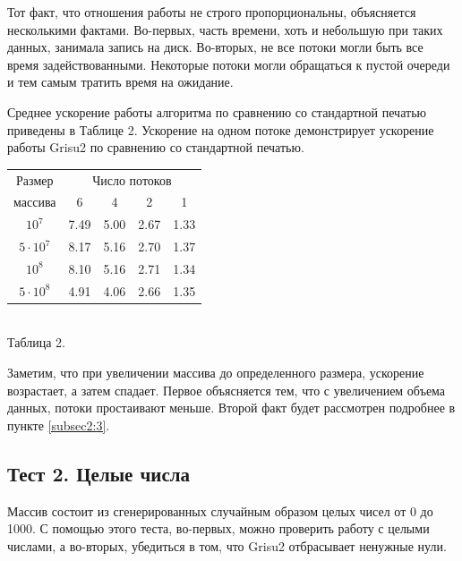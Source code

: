 Тот факт, что отношения работы не строго пропорциональны, объясняется несколькими фактами.
Во-первых, часть времени, хоть и небольшую при таких данных, занимала запись на диск.
Во-вторых, не все потоки могли быть все время задействованными.
Некоторые потоки могли обращаться к пустой очереди и тем самым тратить время на ожидание.

Среднее ускорение работы алгоритма по сравнению со стандартной печатью приведены в Таблице 2.
Ускорение на одном потоке демонстрирует ускорение работы \textsf{Grisu2} по сравнению со стандартной печатью.
\begin{center}
\begin{tabular}{||c|c|c|c|c||}
\hline
\hline
Размер & \multicolumn{4}{c||}{Число потоков}\\
\hhline{~|-|-|-|-|}
массива & 6 & 4 & 2 & 1 \\
\hline
$10^7$ &  7.49  & 5.00 & 2.67 & 1.33 \\
\hline
$5 \cdot 10^7$ & 8.17 & 5.16 & 2.70 & 1.37 \\
\hline
$10^8$ & 8.10 & 5.16 & 2.71 & 1.34\\
\hline
$5 \cdot 10^8$ & 4.91 & 4.06 & 2.66 & 1.35\\
\hline
\hline
\end{tabular}
\\
\vspace{14pt}
\small{Таблица 2.}
\end{center}

Заметим, что при увеличении массива до определенного размера, ускорение возрастает, а затем спадает.
Первое объясняется тем, что с увеличением объема данных, потоки простаивают меньше.
Второй факт будет рассмотрен подробнее в пункте \ref{subsec2:3}.

\subsection{Тест 2. Целые числа} \label{test2}
Массив состоит из сгенерированных случайным образом целых чисел от 0 до 1000.
С помощью этого теста, во-первых, можно проверить работу с целыми числами, а во-вторых, убедиться в том, что \textsf{Grisu2} отбрасывает ненужные нули.

